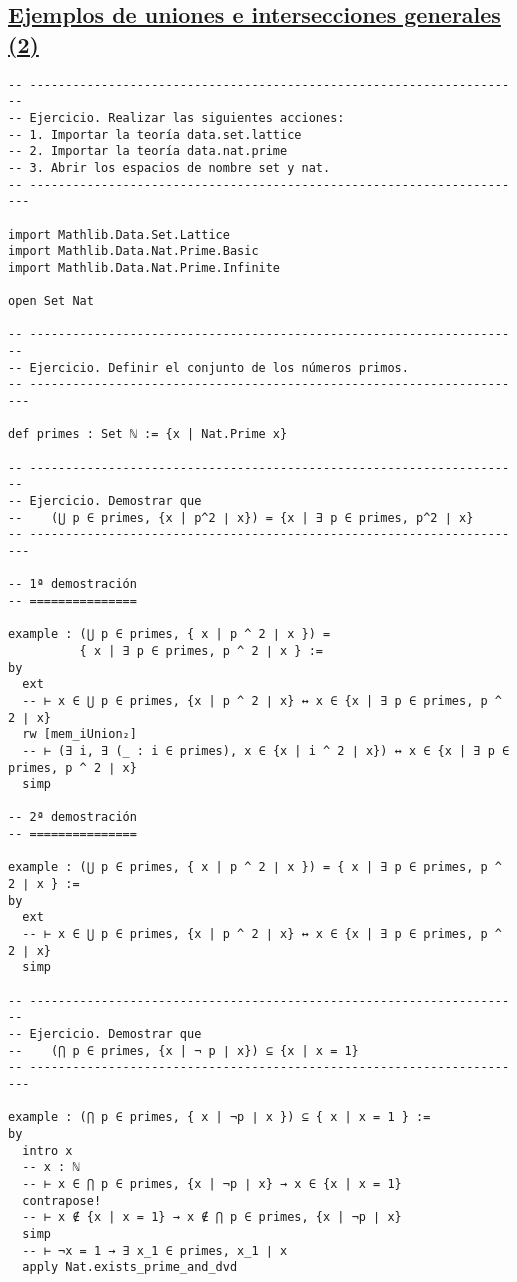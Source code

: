 \subsection{\href{./src/Conjuntos/Ejemplos\_de\_uniones\_e\_intersecciones\_generales\_2.lean}{Ejemplos de uniones e intersecciones generales (2)}}
\label{sec:orgc8cba99}
\begin{verbatim}
-- ---------------------------------------------------------------------
-- Ejercicio. Realizar las siguientes acciones:
-- 1. Importar la teoría data.set.lattice
-- 2. Importar la teoría data.nat.prime
-- 3. Abrir los espacios de nombre set y nat.
-- ----------------------------------------------------------------------

import Mathlib.Data.Set.Lattice
import Mathlib.Data.Nat.Prime.Basic
import Mathlib.Data.Nat.Prime.Infinite

open Set Nat

-- ---------------------------------------------------------------------
-- Ejercicio. Definir el conjunto de los números primos.
-- ----------------------------------------------------------------------

def primes : Set ℕ := {x | Nat.Prime x}

-- ---------------------------------------------------------------------
-- Ejercicio. Demostrar que
--    (⋃ p ∈ primes, {x | p^2 ∣ x}) = {x | ∃ p ∈ primes, p^2 ∣ x}
-- ----------------------------------------------------------------------

-- 1ª demostración
-- ===============

example : (⋃ p ∈ primes, { x | p ^ 2 ∣ x }) =
          { x | ∃ p ∈ primes, p ^ 2 ∣ x } :=
by
  ext
  -- ⊢ x ∈ ⋃ p ∈ primes, {x | p ^ 2 ∣ x} ↔ x ∈ {x | ∃ p ∈ primes, p ^ 2 ∣ x}
  rw [mem_iUnion₂]
  -- ⊢ (∃ i, ∃ (_ : i ∈ primes), x ∈ {x | i ^ 2 ∣ x}) ↔ x ∈ {x | ∃ p ∈ primes, p ^ 2 ∣ x}
  simp

-- 2ª demostración
-- ===============

example : (⋃ p ∈ primes, { x | p ^ 2 ∣ x }) = { x | ∃ p ∈ primes, p ^ 2 ∣ x } :=
by
  ext
  -- ⊢ x ∈ ⋃ p ∈ primes, {x | p ^ 2 ∣ x} ↔ x ∈ {x | ∃ p ∈ primes, p ^ 2 ∣ x}
  simp

-- ---------------------------------------------------------------------
-- Ejercicio. Demostrar que
--    (⋂ p ∈ primes, {x | ¬ p ∣ x}) ⊆ {x | x = 1}
-- ----------------------------------------------------------------------

example : (⋂ p ∈ primes, { x | ¬p ∣ x }) ⊆ { x | x = 1 } :=
by
  intro x
  -- x : ℕ
  -- ⊢ x ∈ ⋂ p ∈ primes, {x | ¬p ∣ x} → x ∈ {x | x = 1}
  contrapose!
  -- ⊢ x ∉ {x | x = 1} → x ∉ ⋂ p ∈ primes, {x | ¬p ∣ x}
  simp
  -- ⊢ ¬x = 1 → ∃ x_1 ∈ primes, x_1 ∣ x
  apply Nat.exists_prime_and_dvd


\end{verbatim}
